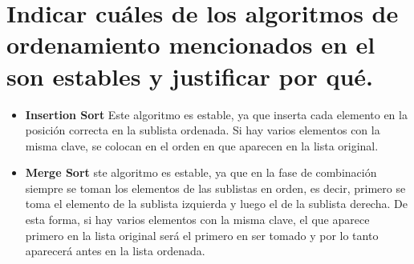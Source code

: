 \section{Indicar cuáles de los algoritmos de ordenamiento mencionados en el
son estables y justificar por qué.}

\begin{itemize}
  \item \textbf{Insertion Sort} Este algoritmo es estable, ya que inserta cada elemento en la posición correcta en la sublista ordenada. Si hay varios elementos con la misma clave, se colocan en el orden en que aparecen en la lista original.
  \item \textbf{Merge Sort} ste algoritmo es estable, ya que en la fase de combinación siempre se toman los elementos de las sublistas en orden, es decir, primero se toma el elemento de la sublista izquierda y luego el de la sublista derecha. De esta forma, si hay varios elementos con la misma clave, el que aparece primero en la lista original será el primero en ser tomado y por lo tanto aparecerá antes en la lista ordenada. 
\end{itemize}


